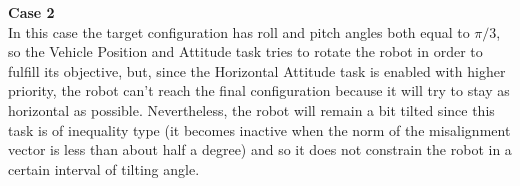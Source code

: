 \documentclass{article}
\begin{document}
{\large \textbf{Case 2}} \\
In this case the target configuration has roll and pitch angles both equal to $ \pi/3 $, so the Vehicle Position and Attitude task tries to rotate the robot in order to fulfill its objective, but, since the Horizontal Attitude task is enabled with higher priority, the robot can't reach the final configuration because it will try to stay as horizontal as possible. Nevertheless, the robot will remain a bit tilted since this task is of inequality type (it becomes inactive when the norm of the misalignment vector is less than about half a degree) and so it does not constrain the robot in a certain interval of tilting angle.
\begin{figure}[H]
	\centering
	\hspace{10mm}
	\label{fig:q2case2ab}
\end{figure}
\end{document}
